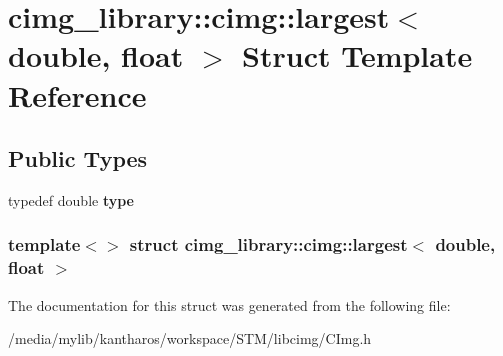 \hypertarget{structcimg__library_1_1cimg_1_1largest_3_01double_00_01float_01_4}{
\section{cimg\_\-library::cimg::largest$<$ double, float $>$ Struct Template Reference}
\label{structcimg__library_1_1cimg_1_1largest_3_01double_00_01float_01_4}
}
\subsection*{Public Types}
\begin{DoxyCompactItemize}
\item 
\hypertarget{structcimg__library_1_1cimg_1_1largest_3_01double_00_01float_01_4_a55e57b89fe233f4e336968fc4d73db9e}{
typedef double {\bfseries type}}
\label{structcimg__library_1_1cimg_1_1largest_3_01double_00_01float_01_4_a55e57b89fe233f4e336968fc4d73db9e}

\end{DoxyCompactItemize}
\subsubsection*{template$<$$>$ struct cimg\_\-library::cimg::largest$<$ double, float $>$}



The documentation for this struct was generated from the following file:\begin{DoxyCompactItemize}
\item 
/media/mylib/kantharos/workspace/STM/libcimg/CImg.h\end{DoxyCompactItemize}
